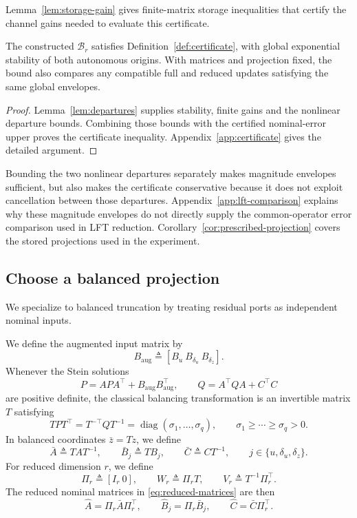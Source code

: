 \documentclass{l4dc2027}
\newcommand{\eqdef}{\triangleq}
\begin{document}
Lemma~\ref{lem:storage-gain} gives finite-matrix storage inequalities that certify the channel gains needed to evaluate this certificate.

\begin{proposition}\label{prop:certificate}
The constructed \mbox{$\mathcal B_r$} satisfies Definition~\ref{def:certificate}, with global exponential stability of both autonomous origins.
With matrices and projection fixed, the bound also compares any compatible full and reduced updates satisfying the same global envelopes.
\end{proposition}
\begin{proof}
Lemma~\ref{lem:departures} supplies stability, finite gains and the nonlinear departure bounds.
Combining those bounds with the certified nominal-error upper proves the certificate inequality.
Appendix~\ref{app:certificate} gives the detailed argument.
\end{proof}

Bounding the two nonlinear departures separately makes magnitude envelopes sufficient, but also makes the certificate conservative because it does not exploit cancellation between those departures.
Appendix~\ref{app:lft-comparison} explains why these magnitude envelopes do not directly supply the common-operator error comparison used in LFT reduction.
Corollary~\ref{cor:prescribed-projection} covers the stored projections used in the experiment.

\subsection{Choose a balanced projection}
We specialize to balanced truncation by treating residual ports as independent nominal inputs.

\begin{definition}\label{def:balanced}
We define the augmented input matrix by
\[
 B_{\mathrm{aug}}\eqdef[B_u\ B_{\delta_u}\ B_{\delta_z}].
\]
Whenever the Stein solutions
\[
 P=APA^\top+B_{\mathrm{aug}}B_{\mathrm{aug}}^\top,\qquad
 Q=A^\top QA+C^\top C
\]
are positive definite, the classical balancing transformation is an invertible matrix \mbox{$T$} satisfying
\[
 TPT^\top=T^{-\top}QT^{-1}
 =\operatorname{diag}(\sigma_1,\ldots,\sigma_q),
 \qquad \sigma_1\ge\cdots\ge\sigma_q>0.
\]
In balanced coordinates \mbox{$\bar z=Tz$}, we define
\[
 \bar A\eqdef TAT^{-1},\qquad
 \bar B_j\eqdef TB_j,\qquad
 \bar C\eqdef CT^{-1},
 \qquad j\in\{u,\delta_u,\delta_z\}.
\]
For reduced dimension \mbox{$r$}, we define
\[
 \Pi_r\eqdef[I_r\ 0],\qquad
 W_r\eqdef\Pi_rT,\qquad V_r\eqdef T^{-1}\Pi_r^\top.
\]
The reduced nominal matrices in \eqref{eq:reduced-matrices} are then
\[
 \widehat A=\Pi_r\bar A\Pi_r^\top,\qquad
 \widehat B_j=\Pi_r\bar B_j,\qquad
 \widehat C=\bar C\Pi_r^\top.
\]
\end{definition}
\end{document}
